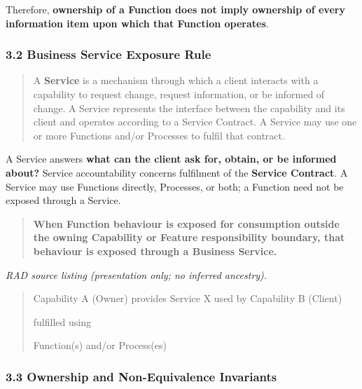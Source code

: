 Therefore, \textbf{ownership of a Function does not imply ownership of every information item upon which that Function operates}.

\label{rad:metamodel:125}
\subsubsection*{3.2 Business Service Exposure Rule}
\label{rad:metamodel:127}

\begin{quote}

A \textbf{Service} is a mechanism through which a client interacts with a capability to request change, request information, or be informed of change. A Service represents the interface between the capability and its client and operates according to a Service Contract. A Service may use one or more Functions and/\allowbreak{}or Processes to fulfil that contract.


\end{quote}
\label{rad:metamodel:133}

A Service answers \textbf{what can the client ask for, obtain, or be informed about?} Service accountability concerns fulfilment of the \textbf{Service Contract}. A Service may use Functions directly, Processes, or both; a Function need not be exposed through a Service.

\label{rad:metamodel:138}

\begin{quote}

\textbf{When Function behaviour is exposed for consumption outside the owning Capability or Feature responsibility boundary, that behaviour is exposed through a Business Service.}


\end{quote}
\label{rad:metamodel:140}

\textit{RAD source listing (presentation only; no inferred ancestry).}
\begin{quote}
Capability A (Owner)    provides    Service X    used by    Capability B (Client)

fulfilled using

Function(s) and/or Process(es)
\end{quote}
\label{rad:metamodel:148}
\subsubsection*{3.3 Ownership and Non-Equivalence Invariants}
\label{rad:metamodel:149}

